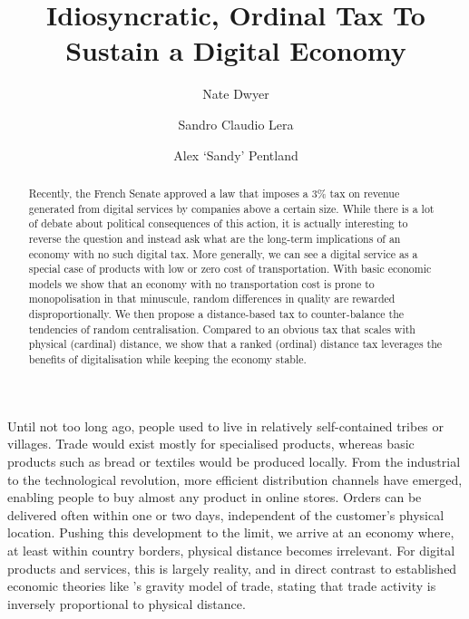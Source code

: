 \documentclass[final,5p,times,twocolumn,11pt,authoryear]{elsarticle}
\numberwithin{equation}{section} %
\begin{document}
\begin{frontmatter}

\title{Idiosyncratic, Ordinal Tax To Sustain a Digital Economy}

\author{Nate Dwyer}

\author{Sandro Claudio Lera}

\author{Alex `Sandy' Pentland}

\address{Massachusetts Institute of Technology, 77 Massachusetts Avenue, 02139 Cambridge, Massachusetts, USA}

\begin{abstract}

Recently, the French Senate approved a law that imposes a $3\%$ tax on revenue generated from digital services by companies above a certain size. 
While there is a lot of debate about political consequences of this action, it is actually interesting to reverse the question and instead ask what are the long-term implications of an economy with no such digital tax. 
More generally, we can see a digital service as a special case of products with low or zero cost of transportation. 
With basic economic models we show that an economy with no transportation cost is prone to monopolisation in that minuscule, random differences in quality are rewarded disproportionally. 
We then propose a distance-based tax to counter-balance the tendencies of random centralisation.  
Compared to an obvious tax that scales with physical (cardinal) distance, we show that a ranked (ordinal) distance tax leverages the benefits of digitalisation while keeping the economy stable. 

\end{abstract} 

\end{frontmatter}

Until not too long ago, people used to live in relatively self-contained tribes or villages. 
Trade would exist mostly for specialised products, whereas basic products such as bread or textiles would be produced locally. 
From the industrial to the technological revolution, more efficient distribution channels have emerged, enabling people to buy almost any product in online stores. 
Orders can be delivered often within one or two days, independent of the customer’s physical location. 
Pushing this development to the limit, we arrive at an economy where, at least within country borders, physical distance becomes irrelevant. 
For digital products and services, this is largely reality, and in direct contrast to established economic theories like \cite{Isard1954}'s gravity model of trade, stating that trade activity is inversely proportional to physical distance. 
\end{document}
